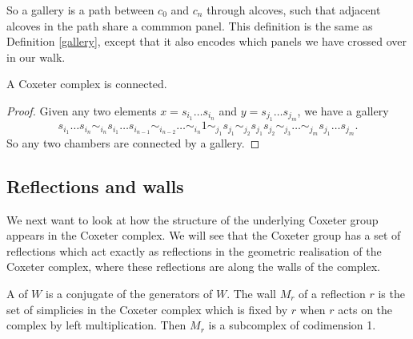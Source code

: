 \documentclass[11pt]{article}
\begin{document}
So a gallery is a path between $c_0$ and $c_n$ through alcoves, such that adjacent alcoves in the path share a commmon panel. This definition is the same as Definition \ref{gallery}, except that it also encodes which panels we have crossed over in our walk. 

\begin{lemma}
    A Coxeter complex is connected.
\end{lemma}

\begin{proof}
    Given any two elements $x=s_{i_1}\hdots s_{i_n}$ and $y=s_{j_1}\hdots s_{j_m}$, we have a gallery
    \[s_{i_1}\hdots s_{i_n}\sim_{i_n}s_{i_1}\hdots s_{i_{n-1}}\sim_{i_{n-2}}\hdots \sim_{i_n} 1 \sim_{j_1}s_{j_1}\sim_{j_2}s_{j_1}s_{j_2}\sim_{j_3}\hdots\sim_{j_m}s_{j_1}\hdots s_{j_m}.\]
    So any two chambers are connected by a gallery.
\end{proof}




\subsection{Reflections and walls}
We next want to look at how the structure of the underlying Coxeter group appears in the Coxeter complex. We will see that the Coxeter group has a set of reflections which act exactly as reflections in the geometric realisation of the Coxeter complex, where these reflections are along the walls of the complex. 

\begin{definition}
    A  of $W$ is a conjugate of the generators of $W$. The wall $M_r$ of a reflection $r$ is the set of simplicies in the Coxeter complex which is fixed by $r$ when $r$ acts on the complex by left multiplication. Then $M_r$ is a subcomplex of codimension 1.
\end{definition}
\end{document}
